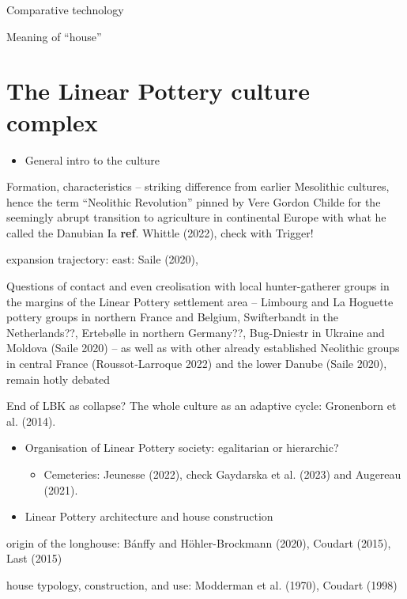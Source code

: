 \documentclass[
  12pt,
]{book}
\providecommand{\tightlist}{%
  \setlength{\itemsep}{0pt}\setlength{\parskip}{0pt}}
\begin{document}
Comparative technology

Meaning of ``house''

\hypertarget{lbk}{%
\section{The Linear Pottery culture complex}\label{lbk}}

\begin{itemize}
\tightlist
\item
  General intro to the culture
\end{itemize}

Formation, characteristics -- striking difference from earlier Mesolithic cultures, hence the term ``Neolithic Revolution'' pinned by Vere Gordon Childe for the seemingly abrupt transition to agriculture in continental Europe with what he called the Danubian Ia \textbf{ref}. Whittle (2022), check with Trigger!

expansion trajectory: east: Saile (2020),

Questions of contact and even creolisation with local hunter-gatherer groups in the margins of the Linear Pottery settlement area -- Limbourg and La Hoguette pottery groups in northern France and Belgium, Swifterbandt in the Netherlands??, Ertebølle in northern Germany??, Bug-Dniestr in Ukraine and Moldova (Saile 2020) -- as well as with other already established Neolithic groups in central France (Roussot‑Larroque 2022) and the lower Danube (Saile 2020), remain hotly debated

End of LBK as collapse? The whole culture as an adaptive cycle: Gronenborn et al. (2014).

\begin{itemize}
\tightlist
\item
  Organisation of Linear Pottery society: egalitarian or hierarchic?

  \begin{itemize}
  \tightlist
  \item
    Cemeteries: Jeunesse (2022), check Gaydarska et al. (2023) and Augereau (2021).
  \end{itemize}
\item
  Linear Pottery architecture and house construction
\end{itemize}

origin of the longhouse: Bánffy and Höhler-Brockmann (2020), Coudart (2015), Last (2015)

house typology, construction, and use: Modderman et al. (1970), Coudart (1998)
\end{document}
